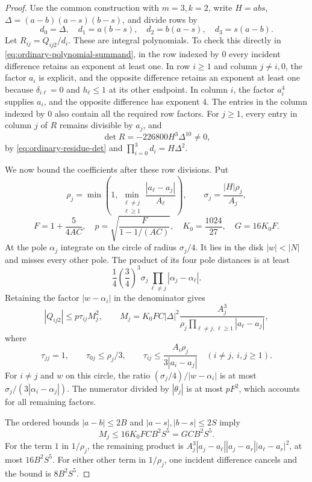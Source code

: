 \documentclass[12pt]{article}
\numberwithin{equation}{section}
\begin{document}
\begin{proof}
Use the common construction with $m=3,k=2$, write
$H=abs$, $\Delta=(a-b)(a-s)(b-s)$, and divide rows by
\[
 d_0=\Delta,\quad d_1=a(b-s),\quad
 d_2=b(a-s),\quad d_3=s(a-b).
\]
Let $R_{ij}=Q_{ij2}/d_i$.  These are integral polynomials.
To check this directly in \eqref{eq:ordinary-polynomial-summand},
in the row indexed by $0$ every incident difference retains an exponent at least one.
In row $i\ge1$ and column $j\ne i,0$, the factor $a_i$ is
explicit, and the opposite difference retains an exponent at least
one because $\delta_{i\ell}=0$ and $h_\ell\le1$ at its other
endpoint.  In column $i$, the factor $a_i^4$ supplies $a_i$, and
the opposite difference has exponent $4$.  The entries in the column indexed by $0$ also contain all the required row factors.  For $j\ge1$, every entry in column $j$ of $R$ remains divisible by
$a_j$, and
\[
 \det R=-226800H^3\Delta^{10}\ne0,
\]
by \eqref{eq:ordinary-residue-det} and
$\prod_{i=0}^3d_i=H\Delta^2$.

We now bound the coefficients after these row divisions.  Put
\[
 \rho_j=\min\left(1,\min_{\substack{\ell\ne j\\\ell\ge1}}
               \frac{|a_\ell-a_j|}{A_\ell}\right),\qquad
 \sigma_j=\frac{|H|\rho_j}{A_j},
\]
\[
 F=1+\frac5{4AC},\quad
 p=\sqrt{\frac{F}{1-1/(AC)}},\quad
 K_0=\frac{1024}{27},\quad G=16K_0F.
\]
At the pole $\alpha_j$ integrate on the circle of radius
$\sigma_j/4$.  It lies in the disk $|w|<|N|$ and misses every other
pole.  The product of its four pole distances is at least
\[
 \frac14\left(\frac34\right)^3
 \sigma_j\prod_{\ell\ne j}|\alpha_j-\alpha_\ell|.
\]
Retaining the factor $|w-\alpha_i|$ in the denominator gives
\[
 |Q_{ij2}|\le p\tau_{ij}M_j^2,\qquad
 M_j=K_0FC|\Delta|^2
       \frac{A_j^3}{\rho_j\prod_{\ell\ne j,\,\ell\ge1}|a_\ell-a_j|},
\]
where
\[
 \tau_{jj}=1,\qquad \tau_{0j}\le\rho_j/3,
 \qquad \tau_{ij}\le
       \frac{A_i\rho_j}{3|a_i-a_j|}\quad(i\ne j,\ i,j\ge1).
\]
For $i\ne j$ and $w$ on this circle, the ratio
$(\sigma_j/4)/|w-\alpha_i|$ is at most $\sigma_j/(3|\alpha_i-\alpha_j|)$.  The numerator
divided by $|\theta_j|$ is at most $pF^2$, which accounts for all
remaining factors.

The ordered bounds $|a-b|\le2B$ and
$|a-s|,|b-s|\le2S$ imply
\begin{equation}\label{eq:ordinary-three-base-bound}
 M_j\le16K_0FCB^2S^5=GCB^2S^5.
\end{equation}
For the term $1$ in $1/\rho_j$, the remaining product is
$A_j^3|a_j-a_\ell||a_j-a_r||a_\ell-a_r|^2$, at most
$16B^2S^5$.  For either other term in $1/\rho_j$, one incident
difference cancels and the bound is $8B^2S^5$.


\end{proof}
\end{document}
